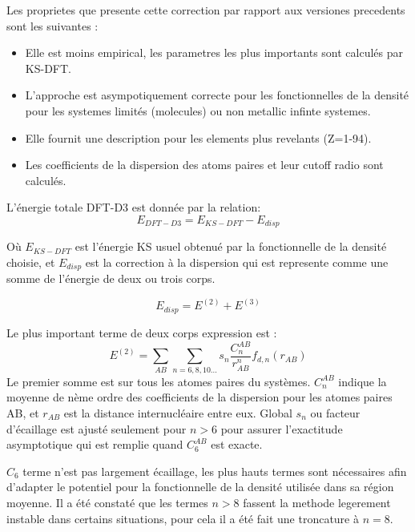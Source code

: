 	Les proprietes que presente cette correction par rapport aux versiones precedents sont les suivantes :
	\bigskip 
	\begin{itemize}
		\item Elle est moins empirical, les parametres les plus importants sont calculés par KS-DFT.
		\item L'approche est asympotiquement correcte pour les fonctionnelles de la densité pour les systemes limités (molecules) ou non metallic infinte systemes.
		\item Elle fournit une description pour les elements plus revelants (Z=1-94).
		\item Les coefficients de la dispersion des atoms paires et leur cutoff radio sont calculés. 
	\end{itemize}
	\bigskip
	
	L'énergie totale DFT-D3 est donnée par la relation:	
	\begin{equation}
	E_{DFT-D3} = E_{KS-DFT} - E_{disp}
	\end{equation} 
	\bigskip
	
	Où $E_{KS-DFT}$ est l'énergie KS usuel obtenué par la fonctionnelle de la densité choisie, et $E_{disp}$ est la correction à la dispersion qui est represente comme une somme de l'énergie de deux ou trois corps.
	
	\begin{equation}
	E_{disp} = E ^{(2)} + E^{(3)}
	\end{equation}
	
	Le plus important terme de deux corps expression est :
	\begin{equation}
	E^{(2)} = \sum_{AB} \sum_{n=6,8,10...} s_{n}\frac{C_{n}^{AB}}{r^{n}_{AB}} f_{d,n} (r_{AB})
	\end{equation}
	Le premier somme est sur tous les atomes paires du systèmes. $C_{n}^{AB}$ indique la moyenne de nème ordre des coefficients de la dispersion pour les atomes paires AB, et $r_{AB}$ est la distance internucléaire entre eux. Global $s_{n}$ ou facteur d'écaillage est ajusté seulement pour $n>6$ pour assurer l'exactitude asymptotique qui est remplie quand $C_{6}^{AB}$ est exacte. 
	\bigskip
	
	$C_{6}$ terme n'est pas largement écaillage, les plus hauts termes sont nécessaires afin d'adapter le potentiel pour la fonctionnelle de la densité utilisée dans sa région moyenne. Il a été constaté que les termes $n>8$ fassent la methode legerement instable dans certains situations, pour cela il a été fait une troncature à $n=8$.
	\bigskip
	
